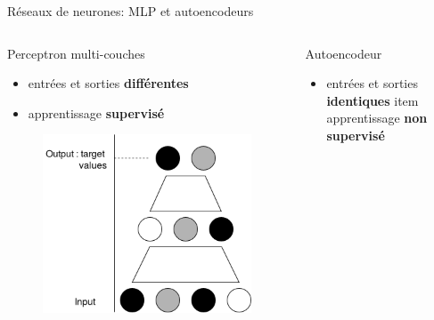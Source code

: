 \documentclass[hyperref={pdfpagelabels=false}]{beamer}
\begin{document}
    \begin{frame}{Réseaux de neurones: MLP et autoencodeurs}
        \begin{columns}
            \begin{column}{0.5\textwidth}
                Perceptron multi-couches
                \begin{itemize}
                    \item entrées et sorties \textbf{différentes}
                    \item apprentissage \textbf{supervisé}
                \end{itemize}
                \begin{figure}[h]
                    \centering
                    \includegraphics[scale=.18]{mlp}
                \end{figure}
            \end{column}
            \begin{column}{0.5 \textwidth}
                Autoencodeur
                \begin{itemize}
                    \item entrées et sorties \textbf{identiques}
                    item apprentissage \textbf{non supervisé}
                \end{itemize}
                \begin{figure}[h]
                    \centering

\end{figure}
\end{column}
\end{columns}
\end{frame}
\end{document}
